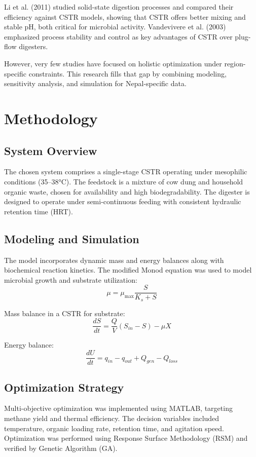\documentclass[12pt,a4paper]{article}
\begin{document}
Li et al. (2011) studied solid-state digestion processes and compared their efficiency against CSTR models, showing that CSTR offers better mixing and stable pH, both critical for microbial activity. Vandevivere et al. (2003) emphasized process stability and control as key advantages of CSTR over plug-flow digesters.

However, very few studies have focused on holistic optimization under region-specific constraints. This research fills that gap by combining modeling, sensitivity analysis, and simulation for Nepal-specific data.

\section{Methodology}
\subsection{System Overview}
The chosen system comprises a single-stage CSTR operating under mesophilic conditions (35--38°C). The feedstock is a mixture of cow dung and household organic waste, chosen for availability and high biodegradability. The digester is designed to operate under semi-continuous feeding with consistent hydraulic retention time (HRT).

\subsection{Modeling and Simulation}
The model incorporates dynamic mass and energy balances along with biochemical reaction kinetics. The modified Monod equation was used to model microbial growth and substrate utilization:
\begin{equation}
\mu = \mu_{\text{max}} \frac{S}{K_s + S}
\end{equation}

Mass balance in a CSTR for substrate:
\begin{equation}
\frac{dS}{dt} = \frac{Q}{V}(S_{in} - S) - \mu X
\end{equation}

Energy balance:
\begin{equation}
\frac{dU}{dt} = q_{in} - q_{out} + Q_{gen} - Q_{loss}
\end{equation}

\subsection{Optimization Strategy}
Multi-objective optimization was implemented using MATLAB, targeting methane yield and thermal efficiency. The decision variables included temperature, organic loading rate, retention time, and agitation speed. Optimization was performed using Response Surface Methodology (RSM) and verified by Genetic Algorithm (GA).
\end{document}
